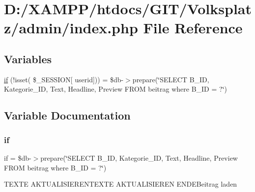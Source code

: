\hypertarget{admin_2index_8php}{}\section{D\+:/\+X\+A\+M\+P\+P/htdocs/\+G\+I\+T/\+Volksplatz/admin/index.php File Reference}
\label{admin_2index_8php}
\subsection*{Variables}
\begin{DoxyCompactItemize}
\item 
\mbox{\hyperlink{admin_2index_8php_a031171ca5346d3d402f67ed337b0eabb}{if}} (!isset( \$\+\_\+\+S\+E\+S\+S\+I\+ON\mbox{[} \textquotesingle{}userid\textquotesingle{}\mbox{]})) = \$db-\/$>$prepare(\char`\"{}S\+E\+L\+E\+CT B\+\_\+\+ID, Kategorie\+\_\+\+ID, Text, Headline, Preview F\+R\+OM beitrag where B\+\_\+\+ID = ?\char`\"{})
\end{DoxyCompactItemize}


\subsection{Variable Documentation}
\mbox{\label{admin_2index_8php_a031171ca5346d3d402f67ed337b0eabb}} 
\subsubsection{\texorpdfstring{if}{if}}
{\footnotesize\ttfamily if = \$db-\/$>$prepare(\char`\"{}S\+E\+L\+E\+CT B\+\_\+\+ID, Kategorie\+\_\+\+ID, Text, Headline, Preview F\+R\+OM beitrag where B\+\_\+\+ID = ?\char`\"{})}

T\+E\+X\+TE A\+K\+T\+U\+A\+L\+I\+S\+I\+E\+R\+E\+N\+T\+E\+X\+TE A\+K\+T\+U\+A\+L\+I\+S\+I\+E\+R\+EN E\+N\+D\+E\+Beitrag laden 